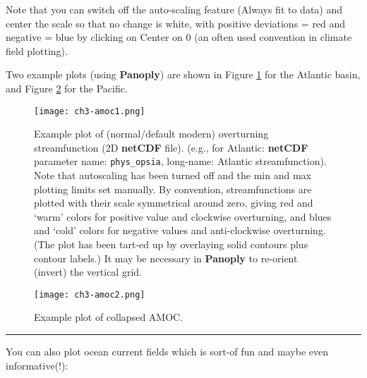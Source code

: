 \documentclass[11pt,fleqn]{book} %
\begin{document}
Note that you can switch off the auto-scaling feature (Always fit to data) and center the scale so that no change is white, with positive deviations = red and negative = blue by clicking on Center on 0 (an often used convention in climate field plotting).

Two example plots (using \textbf{Panoply}) are shown in Figure \ref{fig:ch3-amoc1} for the Atlantic basin, and Figure \ref{fig:ch3-amoc2} for the Pacific. 

\begin{figure}
\texttt{[image: ch3-amoc1.png]}\centering
\vspace{-0mm}
\caption{Example plot of (normal/default modern) overturning streamfunction (2D \textbf{netCDF} file). (e.g., for Atlantic: \textbf{netCDF} parameter name: \texttt{phys\_opsia}, long-name: Atlantic streamfunction). Note that autoscaling has been turned off and the min and max plotting limits set manually. By convention, streamfunctions are plotted with their scale symmetrical around zero, giving red and ‘warm’ colors for positive value and clockwise overturning, and blues and ‘cold’ colors for negative values and anti-clockwise overturning. (The plot has been tart-ed up by overlaying solid contours plus contour labels.) It may be necessary in \textbf{Panoply} to re-orient (invert) the vertical grid.}
\label{fig:ch3-amoc1}
\end{figure}

\begin{figure}
\texttt{[image: ch3-amoc2.png]}\centering
\vspace{-0mm}
\caption{Example plot of collapsed AMOC.}
\label{fig:ch3-amoc2}
\end{figure}

\hfill \break
\noindent\rule{4cm}{0.1mm}
\hfill \break

\noindent You can also plot ocean current fields which is sort-of fun and maybe even informative(!):
\end{document}
